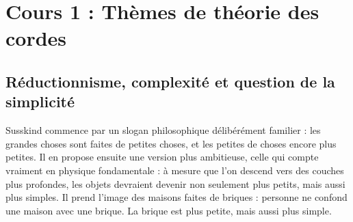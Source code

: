 \chapter{Cours 1 : Thèmes de théorie des cordes}


\section{Réductionnisme, complexité et question de la simplicité}

Susskind commence par un slogan philosophique délibérément familier : les grandes choses sont faites de petites choses, et les petites de choses encore plus petites. Il en propose ensuite une version plus ambitieuse, celle qui compte vraiment en physique fondamentale : à mesure que l’on descend vers des couches plus profondes, les objets devraient devenir non seulement plus petits, mais aussi plus simples. Il prend l’image des maisons faites de briques : personne ne confond une maison avec une brique. La brique est plus petite, mais aussi plus simple.

